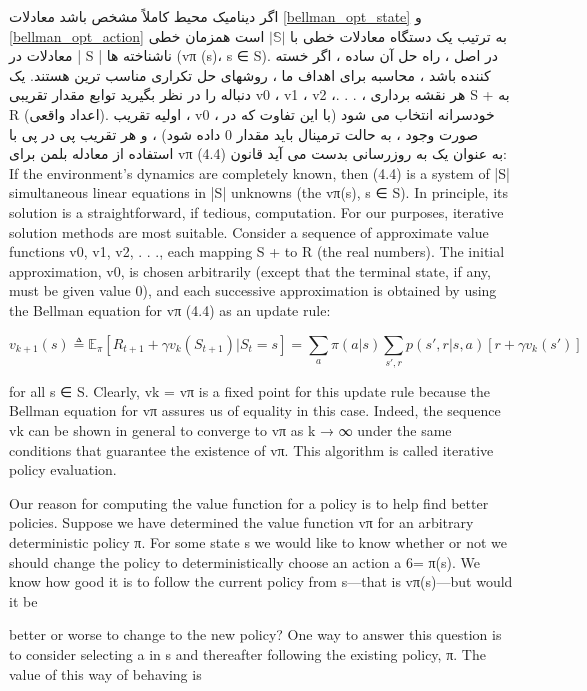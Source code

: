 اگر دینامیک محیط کاملاً مشخص باشد معادلات 
\ref{bellman_opt_state}
و
\ref{bellman_opt_action}
به ترتیب یک دستگاه معادلات خطی با $|\mathbb{S}|$
  است همزمان خطی
معادلات در | S | ناشناخته ها (vπ (s)، s ∈ S). در اصل ، راه حل آن ساده ، اگر خسته کننده باشد ،
محاسبه برای اهداف ما ، روشهای حل تکراری مناسب ترین هستند. یک دنباله را در نظر بگیرید
توابع مقدار تقریبی v0 ، v1 ، v2 ،. . . ، هر نقشه برداری S
+ به R (اعداد واقعی). اولیه
تقریب ، v0 ، خودسرانه انتخاب می شود (با این تفاوت که در صورت وجود ، به حالت ترمینال باید مقدار 0 داده شود) ،
و هر تقریب پی در پی با استفاده از معادله بلمن برای vπ (4.4) به عنوان یک به روزرسانی بدست می آید
قانون:
If the environment’s dynamics are completely known, then (4.4) is a system of |S| simultaneous linear
equations in |S| unknowns (the vπ(s), s ∈ S). In principle, its solution is a straightforward, if tedious,
computation. For our purposes, iterative solution methods are most suitable. Consider a sequence
of approximate value functions v0, v1, v2, . . ., each mapping S
+ to R (the real numbers). The initial
approximation, v0, is chosen arbitrarily (except that the terminal state, if any, must be given value 0),
and each successive approximation is obtained by using the Bellman equation for vπ (4.4) as an update
rule:

$$v_{k+1}(s) \triangleq \mathbb{E}_{\pi} [R_{t+1} + \gamma v_k(S_{t+1}) | S_t=s] = \sum_{a} \pi(a|s) \sum_{s',r} p(s',r | s,a)[r + \gamma v_k(s')]$$


for all s ∈ S. Clearly, vk = vπ is a fixed point for this update rule because the Bellman equation for vπ
assures us of equality in this case. Indeed, the sequence {vk} can be shown in general to converge to
vπ as k → ∞ under the same conditions that guarantee the existence of vπ. This algorithm is called
iterative policy evaluation.



Our reason for computing the value function for a policy is to help find better policies. Suppose we
have determined the value function vπ for an arbitrary deterministic policy π. For some state s we
would like to know whether or not we should change the policy to deterministically choose an action
a 6= π(s). We know how good it is to follow the current policy from s—that is vπ(s)—but would it be

better or worse to change to the new policy? One way to answer this question is to consider selecting
a in s and thereafter following the existing policy, π. The value of this way of behaving is


